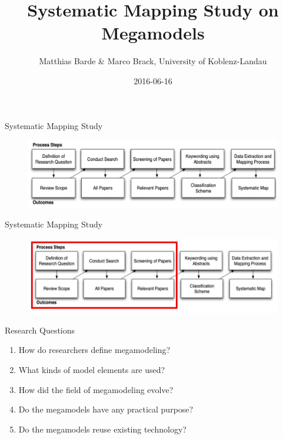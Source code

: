 \documentclass{beamer}
\title[Summary]{Systematic Mapping Study on Megamodels}
\author{Matthias Barde \& Marco Brack, University of Koblenz-Landau}
\institute{SLE course SS 2016 (\url{http://www.softlang.org/course:sle16})}
\date{2016-06-16}
\begin{document}
\begin{frame}
\titlepage
\end{frame}


\begin{frame}{Systematic Mapping Study}
\begin{figure}
	\includegraphics[width=1.0\textwidth]{sms_full}
\end{figure}
\end{frame}

\begin{frame}{Systematic Mapping Study}
\begin{figure}
	\includegraphics[width=1.0\textwidth]{sms_part_marked}
\end{figure}
\end{frame}

\begin{frame}{Research Questions}
\begin{enumerate}
	\item How do researchers define megamodeling?
	\item What kinds of model elements are used?
	\item How did the field of megamodeling evolve?
	\item Do the megamodels have any practical purpose?
	\item Do the megamodels reuse existing technology?	
\end{enumerate}
\end{frame}
\end{document}

